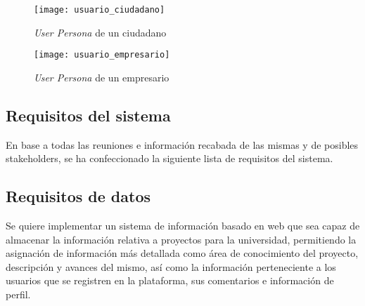 \begin{figure}
    \centering
    \texttt{[image: usuario\_ciudadano]}
    \caption{\textit{User Persona} de un ciudadano}
    \label{usuario_ciudadano}
\end{figure}

\begin{figure}
    \centering
    \texttt{[image: usuario\_empresario]}
    \caption{\textit{User Persona} de un empresario}
    \label{usuario_empresario}
\end{figure}

\subsection{Requisitos del sistema}
En base a todas las reuniones e información recabada de las mismas y de posibles stakeholders, se ha confeccionado la siguiente lista de requisitos del sistema.

\subsection*{Requisitos de datos}
Se quiere implementar un sistema de información basado en web que sea capaz de almacenar la información relativa a proyectos para la universidad, permitiendo la asignación de información más detallada como área de conocimiento del proyecto, descripción y avances del mismo, así como la información perteneciente a los usuarios que se registren en la plataforma, sus comentarios e información de perfil.

